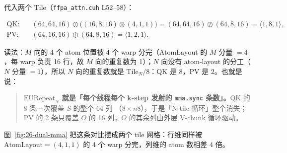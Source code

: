 代入两个 Tile（\texttt{ffpa\_\allowbreak{}attn.\allowbreak{}cuh} L52--58）：

\begin{align}
  \text{QK:}\quad & (64,64,16) \oslash \bigl((16,8,16)\otimes(4,1,1)\bigr)
    = (64,64,16)\oslash(64,8,16) = \langle 1,8,1\rangle ,
  \label{eq:26-qk}\\[2pt]
  \text{PV:}\quad & (64,16,16) \oslash (64,8,16) = \langle 1,2,1\rangle .
  \label{eq:26-pv}
\end{align}

读法：$M$ 向的 4 个 atom 位置被 4 个 warp 分完（$\mathrm{AtomLayout}$ 的
$M$ 分量 $=4$，每 warp 负责 16 行，故 $M$ 向的重复数为 1）；$N$ 向没有
atom-layout 的分工（$N$ 分量 $=1$），所以 $N$ 向的重复数就是
$\mathrm{Tile}_N/8$：QK 是 8，PV 是 2。也就是说：

\begin{quote}
  \textbf{$\mathrm{EURepeat}_N$ 就是「每个线程每个 k-step 发射的
  \texttt{mma.sync} 条数」。}\allowbreak{}QK 的 8 条一次覆盖 $S$ 的整个 64 列
  （$8\times n8$），于是「N-tile 循环」整个消失；PV 的 2 条只覆盖
  $O$ 的 16 列，$O$ 的其余列由外层 V-chunk 循环驱动。
\end{quote}

图~\ref{fig:26-dual-mma} 把这条对比摆成两个 tile 网格：行维同样被
$\mathrm{AtomLayout}=(4,1,1)$ 的 4 个 warp 分完，列维的 atom 数相差 4 倍。

